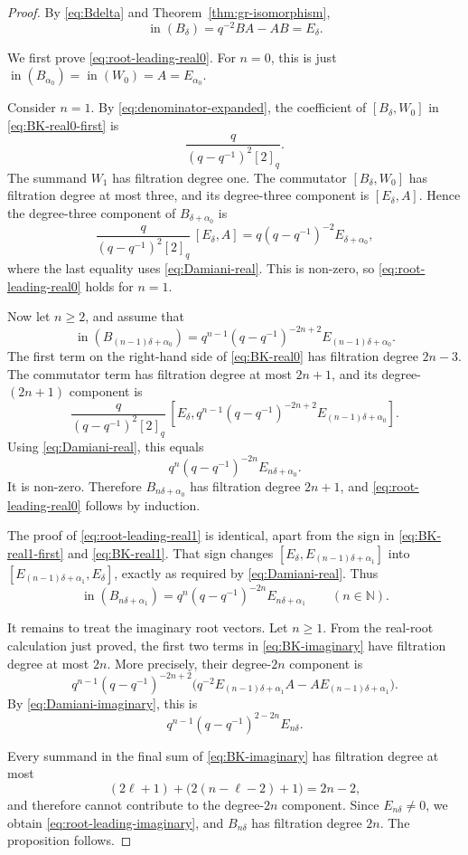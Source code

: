 \documentclass[11pt]{extarticle}
\theoremstyle{definition}
\theoremstyle{remark}
\numberwithin{equation}{section}
\newcommand{\N}{\mathbb N}
\newcommand{\init}{\operatorname{in}}
\newcommand{\comm}[2]{[ #1,#2 ]}
\begin{document}
\begin{proof}
By \eqref{eq:Bdelta} and Theorem~\ref{thm:gr-isomorphism},
\[
        \init(B_\delta)=q^{-2}BA-AB=E_\delta .
\]

We first prove \eqref{eq:root-leading-real0}.  For \(n=0\), this is just
\(\init(B_{\alpha_0})=\init(W_0)=A=E_{\alpha_0}\).

Consider \(n=1\).  By \eqref{eq:denominator-expanded}, the coefficient of
\(\comm{B_\delta}{W_0}\) in \eqref{eq:BK-real0-first} is
\[
        \frac{q}{(q-q^{-1})^2[2]_q}.
\]
The summand \(W_1\) has filtration degree one.  The commutator
\(\comm{B_\delta}{W_0}\) has filtration degree at most three, and its
degree-three component is \(\comm{E_\delta}{A}\).  Hence the degree-three
component of \(B_{\delta+\alpha_0}\) is
\[
        \frac{q}{(q-q^{-1})^2[2]_q}\,
        \comm{E_\delta}{A}
        =
        q(q-q^{-1})^{-2}E_{\delta+\alpha_0},
\]
where the last equality uses \eqref{eq:Damiani-real}.  This is non-zero, so
\eqref{eq:root-leading-real0} holds for \(n=1\).

Now let \(n\geq2\), and assume that
\[
        \init(B_{(n-1)\delta+\alpha_0})
        =
        q^{n-1}(q-q^{-1})^{-2n+2}
        E_{(n-1)\delta+\alpha_0}.
\]
The first term on the right-hand side of \eqref{eq:BK-real0} has filtration
degree \(2n-3\).  The commutator term has filtration degree at most
\(2n+1\), and its degree-\((2n+1)\) component is
\[
 \frac{q}{(q-q^{-1})^2[2]_q}\,
 \comm{E_\delta}{
      q^{n-1}(q-q^{-1})^{-2n+2}
      E_{(n-1)\delta+\alpha_0}} .
\]
Using \eqref{eq:Damiani-real}, this equals
\[
        q^n(q-q^{-1})^{-2n}E_{n\delta+\alpha_0}.
\]
It is non-zero.  Therefore \(B_{n\delta+\alpha_0}\) has filtration degree
\(2n+1\), and \eqref{eq:root-leading-real0} follows by induction.

The proof of \eqref{eq:root-leading-real1} is identical, apart from the
sign in \eqref{eq:BK-real1-first} and \eqref{eq:BK-real1}.  That sign changes
\(\comm{E_\delta}{E_{(n-1)\delta+\alpha_1}}\) into
\(\comm{E_{(n-1)\delta+\alpha_1}}{E_\delta}\), exactly as required by
\eqref{eq:Damiani-real}.  Thus
\[
        \init(B_{n\delta+\alpha_1})
        =
        q^n(q-q^{-1})^{-2n}E_{n\delta+\alpha_1}
        \qquad(n\in\N).
\]

It remains to treat the imaginary root vectors.  Let \(n\geq1\).  From the
real-root calculation just proved, the first two terms in
\eqref{eq:BK-imaginary} have filtration degree at most \(2n\).  More
precisely, their degree-\(2n\) component is
\[
 q^{n-1}(q-q^{-1})^{-2n+2}
 \bigl(q^{-2}E_{(n-1)\delta+\alpha_1}A
       -AE_{(n-1)\delta+\alpha_1}\bigr).
\]
By \eqref{eq:Damiani-imaginary}, this is
\[
        q^{n-1}(q-q^{-1})^{2-2n}E_{n\delta}.
\]

Every summand in the final sum of \eqref{eq:BK-imaginary} has filtration
degree at most
\[
        (2\ell+1)+\bigl(2(n-\ell-2)+1\bigr)=2n-2,
\]
and therefore cannot contribute to the degree-\(2n\) component.  Since
\(E_{n\delta}\neq0\), we obtain \eqref{eq:root-leading-imaginary}, and
\(B_{n\delta}\) has filtration degree \(2n\).  The proposition follows.
\end{proof}
\end{document}
